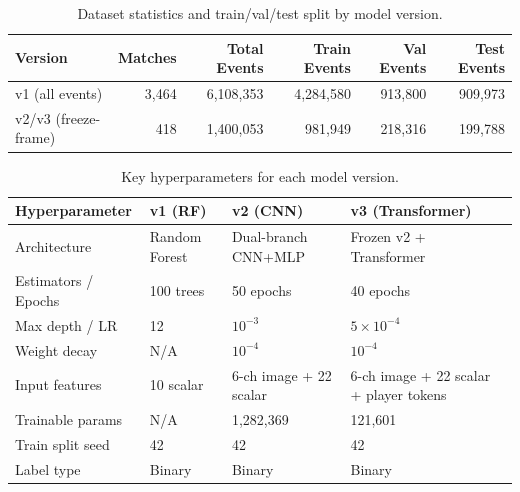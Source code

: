 \begin{table}[h]
\centering
\caption{Dataset statistics and train/val/test split by model version.}
\begin{tabular}{lrrrrr}
\toprule
\textbf{Version} & \textbf{Matches} & \textbf{Total Events} & \textbf{Train Events} & \textbf{Val Events} & \textbf{Test Events} \\
\midrule
v1 (all events)      & 3,464 & 6,108,353 & 4,284,580 & 913,800  & 909,973 \\
v2/v3 (freeze-frame) & 418   & 1,400,053 & 981,949   & 218,316  & 199,788 \\
\bottomrule
\end{tabular}
\label{tab:dataset_stats}
\end{table}

\begin{table}[h]
\centering
\caption{Key hyperparameters for each model version.}
\begin{tabular}{llll}
\toprule
\textbf{Hyperparameter} & \textbf{v1 (RF)} & \textbf{v2 (CNN)} & \textbf{v3 (Transformer)} \\
\midrule
Architecture        & Random Forest       & Dual-branch CNN+MLP  & Frozen v2 + Transformer \\
Estimators / Epochs & 100 trees           & 50 epochs            & 40 epochs \\
Max depth / LR      & 12                  & $10^{-3}$            & $5{\times}10^{-4}$ \\
Weight decay        & N/A                 & $10^{-4}$            & $10^{-4}$ \\
Input features      & 10 scalar           & 6-ch image + 22 scalar & 6-ch image + 22 scalar + player tokens \\
Trainable params    & N/A                 & 1,282,369            & 121,601 \\
Train split seed    & 42                  & 42                   & 42 \\
Label type          & Binary              & Binary               & Binary \\
\bottomrule
\end{tabular}
\label{tab:hyperparams}
\end{table}

